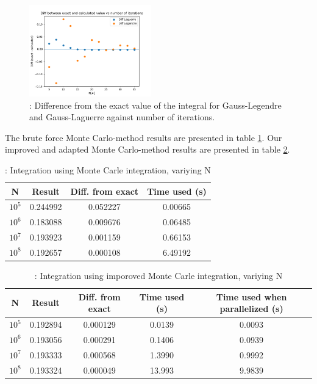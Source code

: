 \documentclass{article}
\begin{document}
	\begin{figure}[hbt]
	\begin{center}
			\includegraphics[width=200px]{Leg_lag_diff.png}
			\caption{: Difference from the exact value of the integral for Gauss-Legendre and Gauss-Laguerre against number of iterations.}
			\label{fig:diff}
	\end{center}
	\end{figure}

	The brute force Monte Carlo-method results are presented in table \ref{Tab: MC}. Our improved and adapted Monte Carlo-method results are presented in table \ref{Tab: improvedMC}.

	\begin{table}[h!]
		\caption{: Integration using Monte Carle integration, variying N}
		\label{Tab: MC}
		\begin{tabular}{c c c c}
			N & Result & Diff. from exact & Time used (s) \\
			\hline
			$10^5$ & 0.244992 & 0.052227 & 0.00665 \\
			$10^6$ & 0.183088 & 0.009676 & 0.06485 \\
			$10^7$ & 0.193923 & 0.001159 & 0.66153 \\
			$10^8$ & 0.192657 & 0.000108 & 6.49192 \\
		\end{tabular}
	\end{table}

	\begin{table}[h!]
		\caption{: Integration using imporoved Monte Carle integration, variying N}
		\begin{tabular}{c c c c c}
			N & Result & Diff. from exact & Time used (s) & Time used when parallelized (s) \\
			\hline
			$10^5$ & 0.192894 & 0.000129 & 0.0139 & 0.0093 \\
			$10^6$ & 0.193056 & 0.000291 & 0.1406 & 0.0939 \\
			$10^7$ & 0.193333 & 0.000568 & 1.3990 & 0.9992 \\
			$10^8$ & 0.193324 & 0.000049 & 13.993 & 9.9839 \\
		\end{tabular}
		\label{Tab: improvedMC}
	\end{table}
\end{document}
